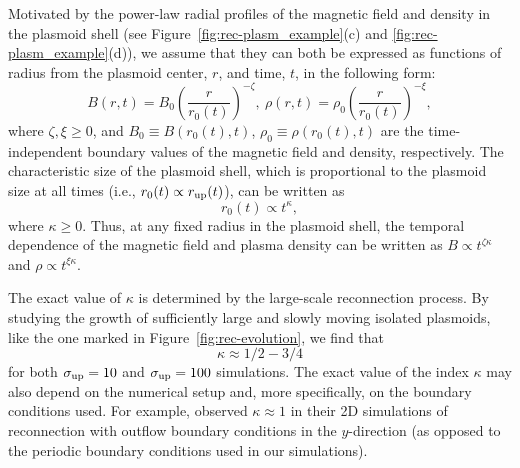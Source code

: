 Motivated by the power-law radial profiles of the magnetic field and density in the plasmoid shell (see Figure~\ref{fig:rec-plasm_example}(c) and \ref{fig:rec-plasm_example}(d)), we assume that they can both be expressed as functions of radius from the plasmoid center, $r$, and time, $t$, in the following form:
\begin{equation}
    \label{eq:rec-radialstruct}
    B(r,t)=B_0\left(\frac{r}{r_0(t)}\right)^{-\zeta},~\rho(r,t)=\rho_0\left(\frac{r}{r_0(t)}\right)^{-\xi},
\end{equation}
where $\zeta, \xi \ge 0$, and $B_0\equiv B(r_0(t), t)$, $\rho_0\equiv \rho(r_0(t), t)$ are the time-independent boundary values of the magnetic field and density, respectively. The characteristic size of the plasmoid shell, which is proportional to the plasmoid size at all times (i.e., $r_0(t)\propto r_{\rm up}(t)$), can be written as
\begin{equation}
    \label{eq:rec-inflationrate}
    r_0(t)\propto t^\kappa,
\end{equation}
where $\kappa\ge 0$. 
Thus, at any fixed radius in the plasmoid shell, the temporal dependence of the magnetic field and plasma density can be written as $B\propto t^{\zeta\kappa}$ and $\rho\propto t^{\xi\kappa}$.

The exact value of $\kappa$ is determined by the large-scale reconnection process. By studying the growth of sufficiently large and slowly moving isolated plasmoids, like the one marked in Figure~\ref{fig:rec-evolution}, we find that
\begin{equation}
\label{eq:rec-kappa}
    \kappa\approx 1/2 - 3/4
\end{equation}
for both $\sigma_{\rm up} = 10$ and $\sigma_{\rm up} = 100$ simulations. The exact value of the index $\kappa$ may also depend on the numerical setup and, more specifically, on the boundary conditions used. For example, \cite{2016MNRAS.462...48S} observed $\kappa\approx 1$ 
in their 2D simulations of reconnection with outflow boundary conditions in the
$y$-direction (as opposed to the periodic boundary conditions used in our simulations).

